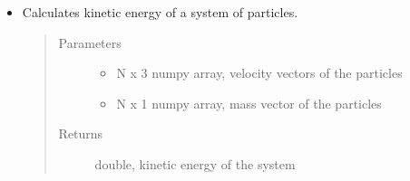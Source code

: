 \documentclass[letterpaper,10pt,english]{sphinxmanual}
\begin{document}
\begin{DUlineblock}{0em}
\item[] 
\end{DUlineblock}
\begin{itemize}
\item {} 

\begin{fulllineitems}
\label{\detokenize{physics:nbody.lib.physics.calc_ke}}
\sphinxAtStartPar
Calculates kinetic energy of a system of particles.
\begin{quote}\begin{description}
\item[{Parameters}] \leavevmode\begin{itemize}
\item {} 
\sphinxAtStartPar
{} \textendash{} N x 3 numpy array, velocity vectors of the particles

\item {} 
\sphinxAtStartPar
{} \textendash{} N x 1 numpy array, mass vector of the particles

\end{itemize}

\item[{Returns}] \leavevmode
\sphinxAtStartPar
double, kinetic energy of the system

\end{description}\end{quote}

\end{fulllineitems}


\end{itemize}
\end{document}
